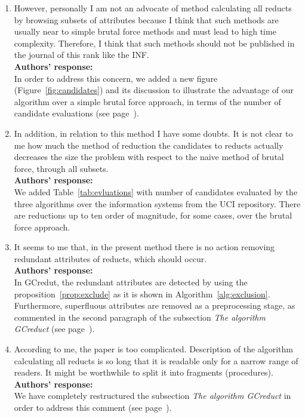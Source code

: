 \documentclass{letter}
\begin{document}
\begin{letter}{}
  \begin{enumerate}
    \item However, personally I am not  an advocate of method calculating all reducts by browsing subsets of attributes because I think that such methods are usually near to simple brutal force methods and must lead to high time complexity. Therefore, I think that such methods should not be published in the journal of this rank like the INF.\\
    \textbf{Authors’ response:} \\
    In order to address this concern, we added a new figure (Figure~\ref{fig:candidates}) and its discussion to illustrate the advantage of our algorithm over a simple brutal force approach, in terms of the number of candidate evaluations (see page~\pageref{par:brutal}).
    
    \item In addition, in relation to this method I have some doubts. It is not clear to me how much the method of reduction the candidates to reducts actually decreases the size the problem with respect to the naive method of brutal force, through all subsets.\\
    \textbf{Authors’ response:}  \\
    We added Table~\ref{tab:evluations} with number of candidates evaluated by the three algorithms over the information systems from the UCI repository. There are reductions up to ten order of magnitude, for some cases, over the brutal force approach.

    \item It seems to me that, in the present method there is no action removing redundant attributes of reducts, which should occur.\\
    \textbf{Authors’ response:} \\
    In GCredut, the redundant attributes are detected by using the proposition~\ref{prop:exclude} as it is shown in Algorithm~\ref{alg:exclusion}. Furthermore, superfluous attributes are removed as a preprocessing stage, as commented in the second paragraph of the subsection \textit{The algorithm GCreduct} (see page~\pageref{superfluous}).

	\item According to me, the paper is too complicated. Description of the algorithm calculating all reducts is so long that it is readable only for a narrow range of readers. It might be worthwhile to split it into fragments (procedures).\\
	\textbf{Authors’ response:} \\
	We have completely restructured the subsection \textit{The algorithm GCreduct} in order to address this comment (see page~\pageref{description}). 


\end{enumerate}
\end{letter}
\end{document}
